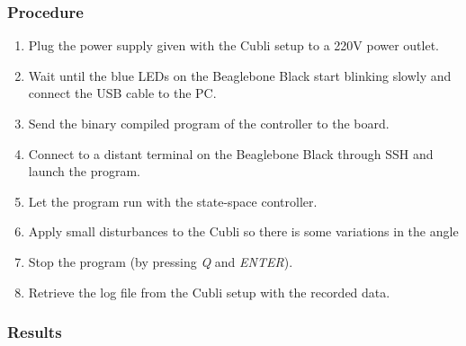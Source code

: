 \subsubsection{Procedure}
\begin{enumerate}
	  \item Plug the power supply given with the Cubli setup to a \si{220}{V} power outlet.
	  \item Wait until the blue LEDs on the Beaglebone Black start blinking slowly and connect the USB cable to the PC.
	  \item Send the binary compiled program of the controller to the board.
	  \item Connect to a distant terminal on the Beaglebone Black through SSH and launch the program.
	  \item Let the program run with the state-space controller.
	  \item Apply small disturbances to the Cubli so there is some variations in the angle
	  \item Stop the program (by pressing \textit{Q} and \textit{ENTER}).
	  \item Retrieve the log file from the Cubli setup with the recorded data.
\end{enumerate}

\subsubsection{Results}
%
%
%

